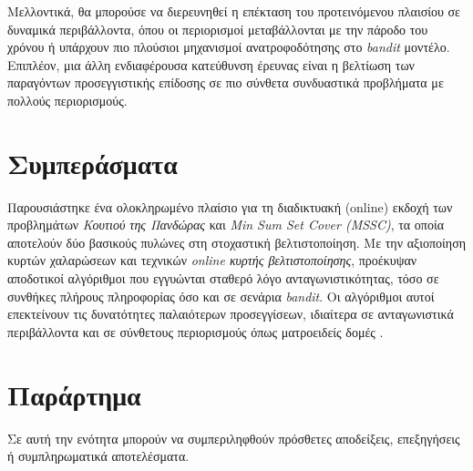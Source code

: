 \documentclass[11pt,a4paper]{article}
\begin{document}
Μελλοντικά, θα μπορούσε να διερευνηθεί η επέκταση του προτεινόμενου πλαισίου σε δυναμικά περιβάλλοντα, όπου οι περιορισμοί μεταβάλλονται με την πάροδο του χρόνου ή υπάρχουν πιο πλούσιοι μηχανισμοί ανατροφοδότησης στο \textit{bandit} μοντέλο. Επιπλέον, μια άλλη ενδιαφέρουσα κατεύθυνση έρευνας είναι η βελτίωση των παραγόντων προσεγγιστικής επίδοσης σε πιο σύνθετα συνδυαστικά προβλήματα με πολλούς περιορισμούς.

\pagebreak

\section{Συμπεράσματα}
Παρουσιάστηκε ένα ολοκληρωμένο πλαίσιο για τη διαδικτυακή (online) εκδοχή των προβλημάτων \textit{Κουτιού της Πανδώρας} και \textit{Min Sum Set Cover (MSSC)}, τα οποία αποτελούν δύο βασικούς πυλώνες στη στοχαστική βελτιστοποίηση. Με την αξιοποίηση κυρτών χαλαρώσεων και τεχνικών \textit{online κυρτής βελτιστοποίησης}, προέκυψαν αποδοτικοί αλγόριθμοι που εγγυώνται σταθερό λόγο ανταγωνιστικότητας, τόσο σε συνθήκες πλήρους πληροφορίας όσο και σε σενάρια \textit{bandit}. Οι αλγόριθμοι αυτοί επεκτείνουν τις δυνατότητες παλαιότερων προσεγγίσεων, ιδιαίτερα σε ανταγωνιστικά περιβάλλοντα και σε σύνθετους περιορισμούς όπως ματροειδείς δομές \cite{gergatsouli2022online}.

\appendix
\section{Παράρτημα}
Σε αυτή την ενότητα μπορούν να συμπεριληφθούν πρόσθετες αποδείξεις, επεξηγήσεις ή συμπληρωματικά αποτελέσματα.



\end{document}
